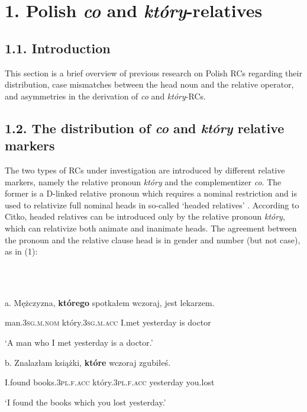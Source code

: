 \documentclass[output=paper]{langsci/langscibook}
\begin{document}
\section{ 1. Polish \textit{co} and \textit{który}{}-relatives}

\subsection{ 1.1. Introduction}

\begin{styleListParagraph}
This section is a brief overview of previous research on Polish RCs regarding their distribution, case mismatches between the head noun and the relative operator, and asymmetries in the derivation of \textit{co} and \textit{który}{}-RCs. 
\end{styleListParagraph}

\subsection{ 1.2. The distribution of \textit{co} and \textit{który} relative markers}

The two types of RCs under investigation are introduced by different relative markers, namely the relative pronoun \textit{który} and the complementizer \textit{co}. The former is a D-linked relative pronoun which requires a nominal restriction and is used to relativize full nominal heads in so-called ‘headed relatives’ \citep{Citko2004}. According to Citko, headed relatives can be introduced only by the relative pronoun \textit{który}, which can relativize both animate and inanimate heads. The agreement between the pronoun and the relative clause head is in gender and number (but not case), as in (1): 

\ea%
    \label{ex:key:1}
    \gll\\
        \\
    \glt
    \z

          a.   Mężczyzna, \textbf{którego} spotkałem wczoraj, jest lekarzem.

    man.\textsc{3sg.m.nom} który.\textsc{3sg.m.acc} I.met yesterday is doctor

    ‘A man who I met yesterday is a doctor.’

  b.   Znalazłam   książki, \textbf{które}   wczoraj zgubiłeś. 

    I.found books.\textsc{3pl.f.acc} który.\textsc{3pl.f.acc} yesterday you.lost

    ‘I found the books which you lost yesterday.’
\end{document}
